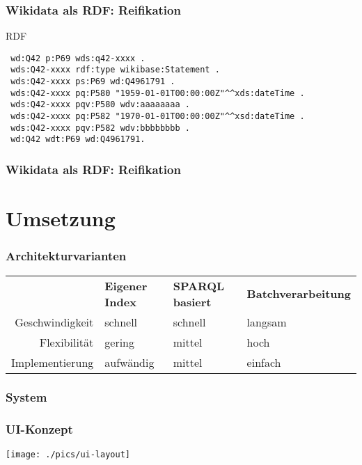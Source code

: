 \documentclass[aspectratio=1610,xcolor=svgnames]{beamer}
\begin{document}
\begin{frame}[t, fragile]\frametitle{Wikidata als RDF: Reifikation}
  \vspace{0.25cm}
  \begin{block}{RDF}
  \begin{verbatim}
 wd:Q42 p:P69 wds:q42-xxxx .
 wds:Q42-xxxx rdf:type wikibase:Statement .
 wds:Q42-xxxx ps:P69 wd:Q4961791 .
 wds:Q42-xxxx pq:P580 "1959-01-01T00:00:00Z"^^xds:dateTime .
 wds:Q42-xxxx pqv:P580 wdv:aaaaaaaa .
 wds:Q42-xxxx pq:P582 "1970-01-01T00:00:00Z"^^xsd:dateTime .
 wds:Q42-xxxx pqv:P582 wdv:bbbbbbbb .
 wd:Q42 wdt:P69 wd:Q4961791.
  \end{verbatim}
  \end{block}
\end{frame}

\begin{frame}[t, fragile]\frametitle{Wikidata als RDF: Reifikation}
  \vspace{0.25cm}
  
\end{frame}

\section{Umsetzung}

\begin{frame}\frametitle{Architekturvarianten}
  \begin{center}
    {\renewcommand{\arraystretch}{1.3}
    \begin{tabular}{r | p{0.20\framewidth}p{0.20\framewidth}p{0.35\framewidth}}
       & {\bfseries Eigener Index} & {\bfseries SPARQL basiert} & {\bfseries Batchverarbeitung} \\
      Geschwindigkeit & schnell & schnell & langsam \\
      Flexibilität & gering & mittel & hoch \\
      Implementierung & aufwändig & mittel & einfach \\
    \end{tabular}
    }
  \end{center}
\end{frame}

\begin{frame}\frametitle{System}
  \begin{figure}
    
  \end{figure}
\end{frame}

\begin{frame}\frametitle{UI-Konzept}
  \centering
  \texttt{[image: ./pics/ui-layout]}
\end{frame}
\end{document}
